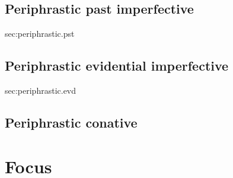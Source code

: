 \documentclass[oldfontcommands,oneside,a4paper,11pt]{article}
\begin{document}
  \subsection{Periphrastic past imperfective } {sec:periphrastic.pst}
  
    \subsection{Periphrastic evidential imperfective } {sec:periphrastic.evd}
    
        \subsection{Periphrastic conative } \label{sec:periphrastic.fact}
        
        
  \section{Focus}
  
  


\end{document}
